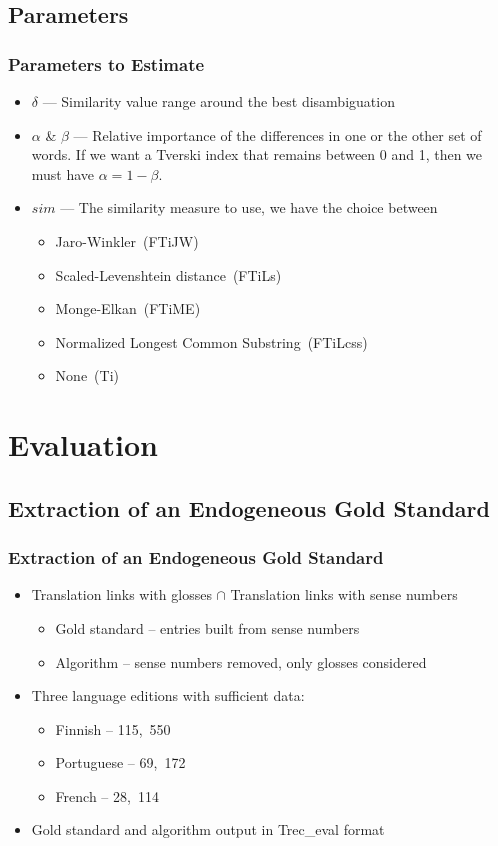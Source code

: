 \documentclass{beamer}
\begin{document}
\subsection{Parameters}
\begin{frame}
\frametitle{Parameters to Estimate}
\begin{itemize}
  \item $\delta$ --- Similarity value range around the best disambiguation
  \vfill
  \item $\alpha$ \& $\beta$ --- Relative importance of the differences in one or the other set of words. If we want a Tverski index that remains between 0 and 1, then we must have $\alpha=1-\beta$.
  \vfill
  \item $sim$ --- The similarity measure to use, we have the choice between
  \begin{itemize}
	  \item Jaro-Winkler~(FTiJW)
	  \item Scaled-Levenshtein distance~(FTiLs)
	  \item Monge-Elkan~(FTiME)
	  \item Normalized Longest Common Substring~(FTiLcss)
	  \item None~(Ti)
  \end{itemize}
\end{itemize}
\end{frame}

\section{Evaluation}

\subsection{Extraction of an Endogeneous Gold Standard}
\begin{frame}
	\frametitle{Extraction of an Endogeneous Gold Standard}
	\begin{itemize}
	\item Translation links with glosses $\cap$ Translation links with sense numbers
	\begin{itemize}
		\item Gold standard -- entries built from sense numbers
		\item Algorithm -- sense numbers removed, only glosses considered
	\end{itemize}
	
	\vfill
	
		\item Three language editions with sufficient data:
		\begin{itemize}
			\item Finnish -- 115,~550
			\item Portuguese -- 69,~172
			\item French -- 28,~114
		\end{itemize}
	\vfill
	\item Gold standard and algorithm output in Trec\_eval format
	\end{itemize}
\end{frame}
\end{document}
